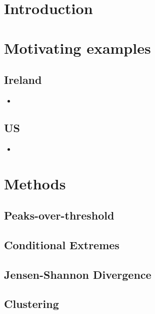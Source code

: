 \documentclass{article}
\numberwithin{equation}{section}
\begin{document}
\newpage

\tableofcontents

\newpage

\section{Introduction}\label{sec:intro}

\section{Motivating examples}
\subsection{Ireland}

\begin{itemize}
    \item 
\end{itemize}

\subsection{US}

\begin{itemize}
    \item 
\end{itemize}

\section{Methods}
\subsection{Peaks-over-threshold}
\subsection{Conditional Extremes}

\subsection{Jensen-Shannon Divergence}
\subsection{Clustering}
\end{document}
